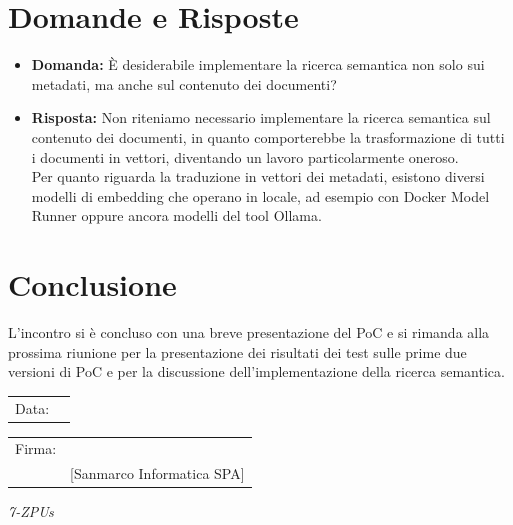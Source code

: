 \documentclass[a4paper,12pt]{article}
\begin{document}
\section{Domande e Risposte}

\begin{itemize}
    \item \textbf{Domanda:} È desiderabile implementare la ricerca semantica non solo sui metadati, ma anche sul contenuto dei documenti?

    \item \textbf{Risposta:} Non riteniamo necessario implementare la ricerca semantica sul contenuto dei documenti, in quanto comporterebbe la trasformazione di tutti i documenti in vettori, diventando un lavoro particolarmente oneroso.\\
    Per quanto riguarda la traduzione in vettori dei metadati, esistono diversi modelli di embedding che operano in locale, ad esempio con Docker Model Runner oppure ancora modelli del tool Ollama.
\end{itemize}

\section{Conclusione}
L'incontro si è concluso con una breve presentazione del PoC e si rimanda alla prossima riunione per la presentazione dei risultati dei test sulle prime due versioni di PoC e per la discussione dell'implementazione della ricerca semantica.

\vfill

\begin{flushleft}
\begin{tabular}{@{}p{0.5in}p{2in}@{}}
Data: & \hrulefill \\
\end{tabular}

\vspace{1em}

\begin{tabular}{@{}p{0.5in}p{2in}@{}}
Firma: & \hrulefill \\
& [Sanmarco Informatica SPA] \\
\end{tabular}
\end{flushleft}

\begin{flushright}
    \textit{7-ZPUs}
\end{flushright}
\end{document}
